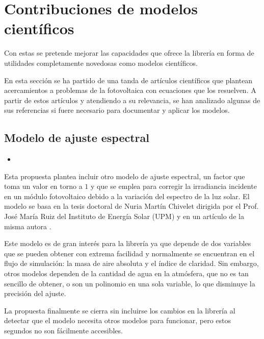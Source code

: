 \section{Contribuciones de modelos científicos} \label{sct:desarrollo:contribuciones_cientificas}

Con estas se pretende mejorar las capacidades que ofrece la librería \pvlibpy{} en forma de utilidades completamente novedosas como modelos científicos.

En esta sección se ha partido de una tanda de artículos científicos que plantean acercamientos a problemas de la fotovoltaica con ecuaciones que los resuelven. A partir de estos artículos y atendiendo a su relevancia, se han analizado algunas de sus referencias si fuere necesario para documentar y aplicar los modelos.

\subsection{Modelo de ajuste espectral}

\begin{itemize}
    \item {}
\end{itemize}

Esta propuesta plantea incluir otro \gls{modelo} de \gls{ajuste espectral}, un factor que toma un valor en torno a $1$ y que se emplea para corregir la \gls{irradiancia} incidente en un \gls{módulo} fotovoltaico debido a la variación del espectro de la luz solar. El modelo se basa en la tesis doctoral de Nuria Martín Chivelet dirigida por el Prof. José María Ruiz del Instituto de Energía Solar (UPM) \cite{Martín_Chivelet_1999} y en un artículo de la misma autora \cite{Martín_Ruiz_1999}.

Este modelo es de gran interés para la librería ya que depende de dos variables que se pueden obtener con extrema facilidad y normalmente se encuentran en el flujo de simulación: la masa de aire absoluta y el \gls{índice de claridad}. Sin embargo, otros modelos dependen de la cantidad de agua en la atmósfera, que no es tan sencillo de obtener, o son un polinomio en una sola variable, lo que disminuye la precisión del ajuste.

La propuesta finalmente se cierra sin incluirse los cambios en la librería al detectar que el modelo necesita otros modelos para funcionar, pero estos segundos no son fácilmente accesibles.


